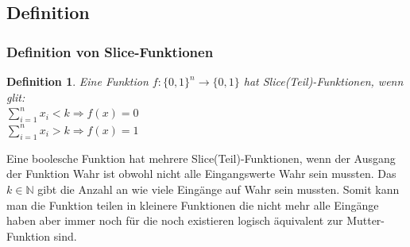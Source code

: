 \documentclass[hyperref={pdfpagelabels=false}]{beamer} %
\newtheorem{defin}{Definition}
\begin{document}
  \subsection*{Definition}
  \begin{frame}%
    \frametitle{Definition von Slice-Funktionen}
    \begin{defin}
      Eine Funktion $f:\{0,1\}^n \rightarrow \{0,1\}$ hat Slice(Teil)-Funktionen, wenn glit:\\

      $\sum_{i=1}^{n} x_i<k\Rightarrow f(x)=0$\\

      $\sum_{i=1}^{n} x_i>k\Rightarrow f(x)=1$\\
    \end{defin}
    Eine boolesche Funktion hat mehrere Slice(Teil)-Funktionen, wenn der Ausgang der Funktion Wahr ist obwohl nicht alle Eingangswerte Wahr sein mussten.
    Das $k \in \mathbb{N}$ gibt die Anzahl an wie viele Eing\"ange auf Wahr sein mussten.
    Somit kann man die Funktion teilen in kleinere Funktionen die nicht mehr alle Eing\"ange haben aber immer noch f\"ur die noch existieren logisch \"aquivalent zur Mutter-Funktion sind.
%
%
  \end{frame}
\end{document}
